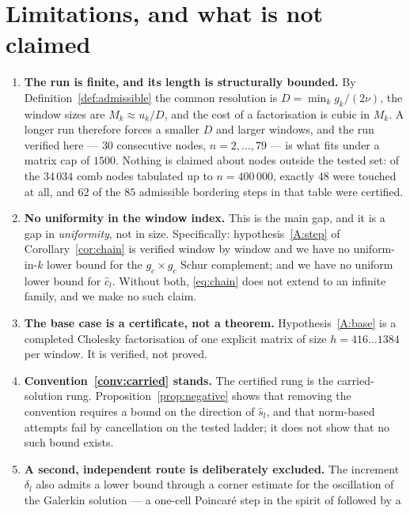 \documentclass[11pt,a4paper]{article}
\theoremstyle{plain}
\theoremstyle{definition}
\newcommand{\shat}{\widehat{s}}
\begin{document}
\section{Limitations, and what is not claimed}
\label{sec:limits}

\begin{enumerate}[label=\textup{(L\arabic*)},leftmargin=3.2em]
\item\label{L:finite} \textbf{The run is finite, and its length is structurally
  bounded.} By Definition~\ref{def:admissible} the common resolution is
  $D=\min_{k}g_{k}/(2\nu)$, the window sizes are $M_{k}\approx u_{k}/D$, and the cost
  of a factorisation is cubic in $M_{k}$. A longer run therefore forces a smaller $D$
  and larger windows, and the run verified here --- $30$ consecutive nodes,
  $n=2,\dots,79$ --- is what fits under a matrix cap of $1500$. Nothing is claimed
  about nodes outside the tested set: of the $34\,034$ comb nodes tabulated up to
  $n=400\,000$, exactly $48$ were touched at all, and $62$ of the $85$ admissible
  bordering steps in that table were certified.
\item\label{L:uniform} \textbf{No uniformity in the window index.} This is the main
  gap, and it is a gap in \emph{uniformity}, not in size. Specifically:
  hypothesis~\ref{A:step} of Corollary~\ref{cor:chain} is verified window by window
  and we have no uniform-in-$k$ lower bound for the $g_{c}\times g_{c}$ Schur
  complement; and we have no uniform lower bound for $\widehat c_{l}$. Without both,
  \eqref{eq:chain} does not extend to an infinite family, and we make no such claim.
\item\label{L:base} \textbf{The base case is a certificate, not a theorem.}
  Hypothesis~\ref{A:base} is a completed Cholesky factorisation of one explicit
  matrix of size $h=416\dots1384$ per window. It is verified, not proved.
\item\label{L:conv} \textbf{Convention~\ref{conv:carried} stands.} The certified rung
  is the carried-solution rung. Proposition~\ref{prop:negative} shows that removing
  the convention requires a bound on the direction of $\shat_{l}$, and that
  norm-based attempts fail by cancellation on the tested ladder; it does not show
  that no such bound exists.
\item\label{L:secondroute} \textbf{A second, independent route is deliberately
  excluded.} The increment $\delta_{l}$ also admits a lower bound through a
  corner estimate for the oscillation of the Galerkin solution --- a one-cell
  Poincar\'e step in the spirit of \cite{PayneWeinberger1960} followed by a

\end{enumerate}
\end{document}
